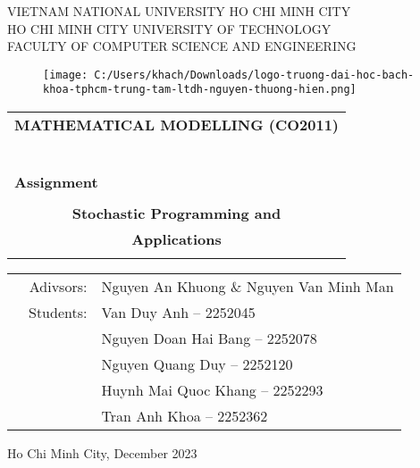 \documentclass[a4paper]{article}
\begin{document}
	
	\begin{titlepage}
		\begin{center}
			VIETNAM NATIONAL UNIVERSITY HO CHI MINH CITY\\
			HO CHI MINH CITY UNIVERSITY OF TECHNOLOGY\\
			FACULTY OF COMPUTER SCIENCE AND ENGINEERING 
		\end{center}
		
		\vspace{1cm}
		
		\begin{figure}[h!]
			\begin{center}
				\texttt{[image: C:/Users/khach/Downloads/logo-truong-dai-hoc-bach-khoa-tphcm-trung-tam-ltdh-nguyen-thuong-hien.png]}
			\end{center}
		\end{figure}
		
		\vspace{1cm}
		
		
		\begin{center}
			\begin{tabular}{c}
				\multicolumn{1}{l}{\textbf{{\Large MATHEMATICAL MODELLING (CO2011)}}}\\
				~~\\
				\hline
				\\
				\multicolumn{1}{l}{\textbf{{\Large Assignment}}}\\
				\\
				\textbf{{\Huge Stochastic Programming and}} \\
				\textbf{{\Huge Applications}} \\
				
				\\
				\hline
			\end{tabular}
		\end{center}
		
		
		\vspace{1.5cm}
		
		\begin{table}[h]
			\begin{tabular}{rrl}
				\hspace{5 cm} & Adivsors: & Nguyen An Khuong \& Nguyen Van Minh Man\\				
				& Students: & Van Duy Anh -- 2252045 \\
				& & Nguyen Doan Hai Bang -- 2252078 \\
				& & Nguyen Quang Duy -- 2252120 \\
				& & Huynh Mai Quoc Khang -- 2252293 \\
				& & Tran Anh Khoa -- 2252362 \\
			\end{tabular}
		\end{table}
		\begin{center}
			{\footnotesize \Large Ho Chi Minh City, December 2023}
		\end{center}
	\end{titlepage}
	
\end{document}
